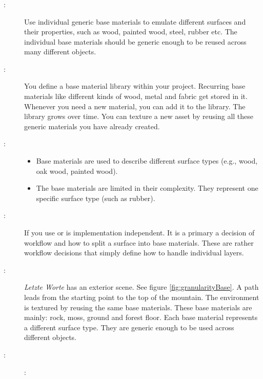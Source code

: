 \subsubsection{\patGranularityBase}\label{\patGranularityBase}
\begin{description}
	\item[\patIntent:]%
	Use individual generic base materials to emulate different surfaces and their properties, such as wood, painted wood, steel, rubber etc.  The individual base materials should be generic enough to be reused across many different objects.
	\item[\patMotivation:]%
	You define a base material library within your project. Recurring base materials like different kinds of wood, metal and fabric get stored in it. Whenever you need a new material, you can add it to the library. The library grows over time. You can texture a new asset by reusing all these generic materials you have already created.
	\item[\patApplicability:]\hfill 
	\begin{itemize}\mynobreakpar
		\item Base materials are used to describe different surface types (e.g., wood, oak wood, painted wood).
		\item The base materials are limited in their complexity. They represent one specific surface type (such as rubber). 
	\end{itemize}
	\item[\patImplementation:]%
	If you use \emph{\patGranularityBase} or \emph{\patGranularityVariation} is implementation independent. It is a primary a decision of workflow and how to split a surface into base materials. These are rather workflow decisions that simply define how to handle individual layers.
	\item[\patExamples:]%
	\emph{Letzte Worte} has an exterior scene. See figure \ref{fig:granularityBase}. A path leads from the starting point to the top of the mountain. The environment is textured by reusing the same base materials. These base materials are mainly: rock, moss, ground and forest floor. Each base material represents a different surface type. They are generic enough to be used across different objects. 
	\item[\patConsequences:]%
	\begin{description}
		\item[\visual:]\hfill
			\begin{itemize}

\end{itemize}
\end{description}
\end{description}
